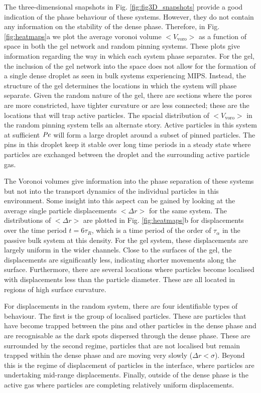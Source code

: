 The three-dimensional snapshots in Fig. \ref{fig:fig3D_snapshots} provide a good indication of the phase behaviour of these systems. However, they do not contain any information on the stability of the dense phase. Therefore, in Fig. \ref{fig:heatmaps}a we plot the average voronoi volume $<V_{\textrm{voro}}>$ as a function of space in both the gel network and random pinning systems. These plots give information regarding the way in which each system phase separates. For the gel, the inclusion of the gel network into the space does not allow for the formation of a single dense droplet as seen in bulk systems experiencing MIPS. Instead, the structure of the gel determines the locations in which the system will phase separate. Given the random nature of the gel, there are sections where the pores are more constricted, have tighter curvature or are less connected; these are the locations that will trap active particles. The spacial distribution of $<V_{\textrm{voro}}>$ in the random pinning system tells an alternate story. Active particles in this system at sufficient $\operatorname{\mathit{P\kern-.08em e}}$ will form a large droplet around a subset of pinned particles. The pins in this droplet keep it stable over long time periods in a steady state where particles are exchanged between the droplet and the surrounding active particle gas.

 The Voronoi volumes give information into the phase separation of these systems but not into the transport dynamics of the individual particles in this environment. Some insight into this aspect can be gained by looking at the average single particle displacements $<\Delta r>$ for the same system. The distributions of $<\Delta r>$ are plotted in Fig. \ref{fig:heatmaps}b for displacements over the time period $t=6\tau_R$, which is a time period of the order of $\tau_{\alpha}$ in the passive bulk system at this density. For the gel system, these displacements are largely uniform in the wider channels. Close to the surfaces of the gel, the displacements are significantly less, indicating shorter movements along the surface. Furthermore, there are several locations where particles become  localised with displacements less than the particle diameter. These are all located in regions of high surface curvature.
 
 
 For displacements in the random system, there are four identifiable types of behaviour. The first is the group of localised particles. These are particles that have become trapped between the pins and other particles in the dense phase and are recognisable as the dark spots dispersed through the dense phase. These are surrounded by the second regime, particles that are not localised but remain trapped within the dense phase and are moving very slowly ($\Delta r < \sigma$). Beyond this is the regime of displacement of particles in the interface, where particles are undertaking mid-range displacements. Finally, outside of the dense phase is the active gas where particles are completing relatively uniform displacements.
 
